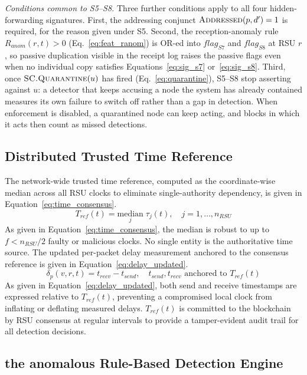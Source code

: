 \documentclass[12pt, a4paper]{report}
\begin{document}
\textit{Conditions common to S5--S8.} Three further
conditions apply to all four hidden-forwarding
signatures. First, the addressing conjunct
$\textsc{Addressed}(p,d')=1$ is required, for the
reason given under S5. Second, the reception-anomaly
rule $R_{anom}(r,t)>0$ (Eq.~\ref{eq:feat_ranom}) is
OR-ed into $flag_{S7}$ and $flag_{S8}$ at \ac{RSU} $r$,
so passive duplication visible in the receipt log
raises the passive flags even when no individual copy
satisfies Equations~\eqref{eq:sig_s7}
or~\eqref{eq:sig_s8}. Third, once
$\textsc{SC.Quarantine}(u)$ has fired
(Eq.~\ref{eq:quarantine}), S5--S8 stop asserting
against $u$: a detector that keeps accusing a node the
system has already contained measures its own failure
to switch off rather than a gap in detection. When enforcement is disabled, a
quarantined node can keep acting, and blocks in which
it acts then count as missed detections.


\subsection{Distributed Trusted Time Reference}
\label{sec:time_ref}

The network-wide trusted time reference, computed as the
coordinate-wise median across all \ac{RSU} clocks to
eliminate single-authority dependency, is given in
Equation~\eqref{eq:time_consensus}.
\begin{equation}
T_{ref}(t)=\underset{j}{\text{median}}\;\tau_j(t),
\quad j=1,\ldots,n_{RSU}
\label{eq:time_consensus}
\end{equation}
As given in Equation~\eqref{eq:time_consensus}, the
median is robust to up to $f{<}n_{RSU}/2$ faulty or
malicious clocks. No single entity is the authoritative
time source.
The updated per-packet delay measurement anchored to
the consensus reference is given in
Equation~\eqref{eq:delay_updated}.
\begin{equation}
\delta_p(v,r,t)=t_{recv}-t_{send},\quad
t_{send},t_{recv}\text{ anchored to }T_{ref}(t)
\label{eq:delay_updated}
\end{equation}
As given in Equation~\eqref{eq:delay_updated}, both
send and receive timestamps are expressed relative to
$T_{ref}(t)$, preventing a compromised local clock from
inflating or deflating measured delays. $T_{ref}(t)$ is
committed to the blockchain by \ac{RSU} consensus at
regular intervals to provide a tamper-evident audit
trail for all detection decisions.

\subsection{the anomalous Rule-Based Detection Engine}
\label{sec:rule_based}
\end{document}
